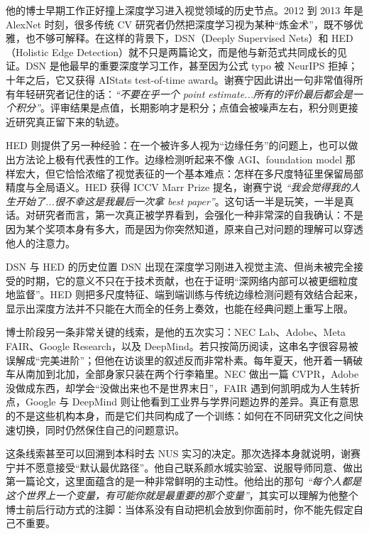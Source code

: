 \documentclass[a4paper,12pt]{article}
\begin{document}
他的博士早期工作正好撞上深度学习进入视觉领域的历史节点。2012 到 2013 年是 AlexNet 时刻，很多传统 CV 研究者仍然把深度学习视为某种“炼金术”，既不够优雅，也不够可解释。在这样的背景下，DSN（Deeply Supervised Nets）和 HED（Holistic Edge Detection）就不只是两篇论文，而是他与新范式共同成长的见证。DSN 是他最早的重要深度学习工作，甚至因为公式 typo 被 NeurIPS 拒掉；十年之后，它又获得 AIStats test-of-time award。谢赛宁因此讲出一句非常值得所有年轻研究者记住的话：\textit{``不要在乎一个 point estimate...所有的评价最后都会是一个积分''}。评审结果是点值，长期影响才是积分；点值会被噪声左右，积分则更接近研究真正留下来的轨迹。

HED 则提供了另一种经验：在一个被许多人视为“边缘任务”的问题上，也可以做出方法论上极有代表性的工作。边缘检测听起来不像 AGI、foundation model 那样宏大，但它恰恰浓缩了视觉表征的一个基本难点：怎样在多尺度特征里保留局部精度与全局语义。HED 获得 ICCV Marr Prize 提名，谢赛宁说 \textit{``我会觉得我的人生开始了...很不幸这是我最后一次拿 best paper''}。这句话一半是玩笑，一半是真话。对研究者而言，第一次真正被学界看到，会强化一种非常深的自我确认：不是因为某个奖项本身有多大，而是因为你突然知道，原来自己对问题的理解可以穿透他人的注意力。

\begin{knowledgebox}{DSN 与 HED 的历史位置}
DSN 出现在深度学习刚进入视觉主流、但尚未被完全接受的时期，它的意义不只在于技术贡献，也在于证明“深网络内部可以被更细粒度地监督”。HED 则把多尺度特征、端到端训练与传统边缘检测问题有效结合起来，显示出深度方法并不只能在大而全的任务上奏效，也能在经典问题上重写上限。
\end{knowledgebox}

博士阶段另一条非常关键的线索，是他的五次实习：NEC Lab、Adobe、Meta FAIR、Google Research，以及 DeepMind。若只按简历阅读，这串名字很容易被误解成“完美进阶”；但他在访谈里的叙述反而非常朴素。每年夏天，他开着一辆破车从南加到北加，全部身家只装在两个行李箱里。NEC 做出一篇 CVPR，Adobe 没做成东西，却学会“没做出来也不是世界末日”，FAIR 遇到何凯明成为人生转折点，Google 与 DeepMind 则让他看到工业界与学界问题边界的差异。真正有意思的不是这些机构本身，而是它们共同构成了一个训练：如何在不同研究文化之间快速切换，同时仍然保住自己的问题意识。

这条线索甚至可以回溯到本科时去 NUS 实习的决定。那次选择本身就说明，谢赛宁并不愿意接受“默认最优路径”。他自己联系颜水城实验室、说服导师同意、做出第一篇论文，这里面蕴含的是一种非常鲜明的主动性。他给出的那句 \textit{``每个人都是这个世界上一个变量，有可能你就是最重要的那个变量''}，其实可以理解为他整个博士前后行动方式的注脚：当体系没有自动把机会放到你面前时，你不能先假定自己不重要。
\end{document}
